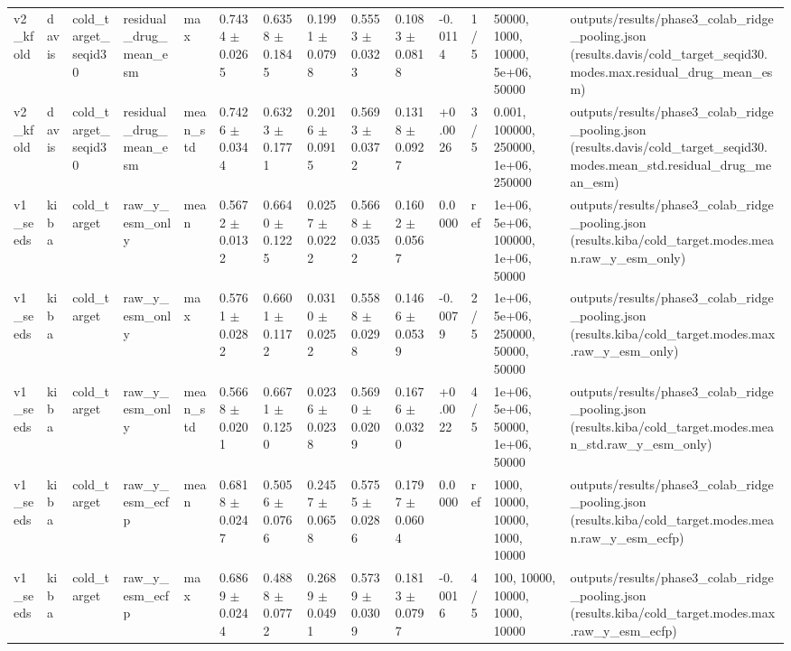 \begin{table}[htbp]
\begin{tabular}{llllllllllllll}
v2\_kfold & davis & cold\_target\_seqid30 & residual\_drug\_mean\_esm & max & 0.7434 $\pm$ 0.0265 & 0.6358 $\pm$ 0.1845 & 0.1991 $\pm$ 0.0798 & 0.5553 $\pm$ 0.0323 & 0.1083 $\pm$ 0.0818 & -0.0114 & 1/5 & 50000, 1000, 10000, 5e+06, 50000 & outputs/results/phase3\_colab\_ridge\_pooling.json (results.davis/cold\_target\_seqid30.modes.max.residual\_drug\_mean\_esm) \\
v2\_kfold & davis & cold\_target\_seqid30 & residual\_drug\_mean\_esm & mean\_std & 0.7426 $\pm$ 0.0344 & 0.6323 $\pm$ 0.1771 & 0.2016 $\pm$ 0.0915 & 0.5693 $\pm$ 0.0372 & 0.1318 $\pm$ 0.0927 & +0.0026 & 3/5 & 0.001, 100000, 250000, 1e+06, 250000 & outputs/results/phase3\_colab\_ridge\_pooling.json (results.davis/cold\_target\_seqid30.modes.mean\_std.residual\_drug\_mean\_esm) \\
v1\_seeds & kiba & cold\_target & raw\_y\_esm\_only & mean & 0.5672 $\pm$ 0.0132 & 0.6640 $\pm$ 0.1225 & 0.0257 $\pm$ 0.0222 & 0.5668 $\pm$ 0.0352 & 0.1602 $\pm$ 0.0567 & 0.0000 & ref & 1e+06, 5e+06, 100000, 1e+06, 50000 & outputs/results/phase3\_colab\_ridge\_pooling.json (results.kiba/cold\_target.modes.mean.raw\_y\_esm\_only) \\
v1\_seeds & kiba & cold\_target & raw\_y\_esm\_only & max & 0.5761 $\pm$ 0.0282 & 0.6601 $\pm$ 0.1172 & 0.0310 $\pm$ 0.0252 & 0.5588 $\pm$ 0.0298 & 0.1466 $\pm$ 0.0539 & -0.0079 & 2/5 & 1e+06, 5e+06, 250000, 50000, 50000 & outputs/results/phase3\_colab\_ridge\_pooling.json (results.kiba/cold\_target.modes.max.raw\_y\_esm\_only) \\
v1\_seeds & kiba & cold\_target & raw\_y\_esm\_only & mean\_std & 0.5668 $\pm$ 0.0201 & 0.6671 $\pm$ 0.1250 & 0.0236 $\pm$ 0.0238 & 0.5690 $\pm$ 0.0209 & 0.1676 $\pm$ 0.0320 & +0.0022 & 4/5 & 1e+06, 5e+06, 50000, 1e+06, 50000 & outputs/results/phase3\_colab\_ridge\_pooling.json (results.kiba/cold\_target.modes.mean\_std.raw\_y\_esm\_only) \\
v1\_seeds & kiba & cold\_target & raw\_y\_esm\_ecfp & mean & 0.6818 $\pm$ 0.0247 & 0.5056 $\pm$ 0.0766 & 0.2457 $\pm$ 0.0658 & 0.5755 $\pm$ 0.0286 & 0.1797 $\pm$ 0.0604 & 0.0000 & ref & 1000, 10000, 10000, 1000, 10000 & outputs/results/phase3\_colab\_ridge\_pooling.json (results.kiba/cold\_target.modes.mean.raw\_y\_esm\_ecfp) \\
v1\_seeds & kiba & cold\_target & raw\_y\_esm\_ecfp & max & 0.6869 $\pm$ 0.0244 & 0.4888 $\pm$ 0.0772 & 0.2689 $\pm$ 0.0491 & 0.5739 $\pm$ 0.0309 & 0.1813 $\pm$ 0.0797 & -0.0016 & 4/5 & 100, 10000, 10000, 1000, 10000 & outputs/results/phase3\_colab\_ridge\_pooling.json (results.kiba/cold\_target.modes.max.raw\_y\_esm\_ecfp) \\

\end{tabular}
\end{table}
